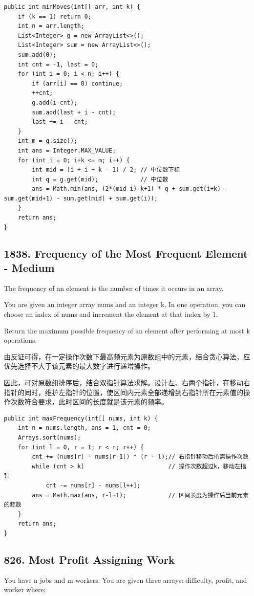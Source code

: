 \documentclass[9pt, b5paaper]{book}
\begin{document}
\begin{verbatim}
public int minMoves(int[] arr, int k) {
    if (k == 1) return 0;
    int n = arr.length;
    List<Integer> g = new ArrayList<>();
    List<Integer> sum = new ArrayList<>();
    sum.add(0);
    int cnt = -1, last = 0;
    for (int i = 0; i < n; i++) {
        if (arr[i] == 0) continue;
        ++cnt;
        g.add(i-cnt);
        sum.add(last + i - cnt);
        last += i - cnt; 
    }
    int m = g.size();
    int ans = Integer.MAX_VALUE;
    for (int i = 0; i+k <= m; i++) {
        int mid = (i + i + k - 1) / 2; // 中位数下标
        int q = g.get(mid);            // 中位数
        ans = Math.min(ans, (2*(mid-i)-k+1) * q + sum.get(i+k) - sum.get(mid+1) - sum.get(mid) + sum.get(i));
    }
    return ans;
}
\end{verbatim}
\subsection{1838. Frequency of the Most Frequent Element - Medium}
\label{sec-5-0-8}
The frequency of an element is the number of times it occurs in an array.

You are given an integer array nums and an integer k. In one operation, you can choose an index of nums and increment the element at that index by 1.

Return the maximum possible frequency of an element after performing at most k operations.

由反证可得，在一定操作次数下最高频元素为原数组中的元素，结合贪心算法，应优先选择不大于该元素的最大数字进行递增操作。

因此，可对原数组排序后，结合双指针算法求解。设计左、右两个指针，在移动右指针的同时，维护左指针的位置，使区间内元素全部递增到右指针所在元素值的操作次数符合要求，此时区间的长度就是该元素的频率。

\begin{verbatim}
public int maxFrequency(int[] nums, int k) {
    int n = nums.length, ans = 1, cnt = 0;
    Arrays.sort(nums);
    for (int l = 0, r = 1; r < n; r++) {
        cnt += (nums[r] - nums[r-1]) * (r - l);// 右指针移动后所需操作次数
        while (cnt > k)                        // 操作次数超过k，移动左指针
            cnt -= nums[r] - nums[l++];
        ans = Math.max(ans, r-l+1);            // 区间长度为操作后当前元素的频数
    }
    return ans;
}
\end{verbatim}

\subsection{826. Most Profit Assigning Work}
\label{sec-5-0-9}
You have n jobs and m workers. You are given three arrays: difficulty, profit, and worker where:
\end{document}
